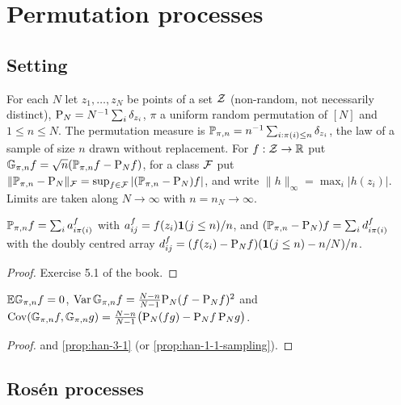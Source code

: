 \chapter{Permutation processes}
\label{chap:permutation-processes}

\section{Setting}

\begin{definition}
  \label{def:population}
  For each $N$ let $z_1,\dots,z_N$ be points of a set $\mathcal{Z}$ (non-random, not necessarily distinct), $\mathrm{P}_N=N^{-1}\sum_i\delta_{z_i}$, $\pi$ a uniform random permutation of $[N]$ and $1\le n\le N$. The permutation measure is $\mathbb{P}_{\pi,n}=n^{-1}\sum_{i:\pi(i)\le n}\delta_{z_i}$, the law of a sample of size $n$ drawn without replacement. For $f:\mathcal{Z}\to\mathbb{R}$ put $\mathbb{G}_{\pi,n} f=\sqrt n(\mathbb{P}_{\pi,n} f-\mathrm{P}_N f)$, for a class $\mathcal{F}$ put $\|\mathbb{P}_{\pi,n}-\mathrm{P}_N\|_{\mathcal{F}}=\sup_{f\in\mathcal{F}}|(\mathbb{P}_{\pi,n}-\mathrm{P}_N)f|$, and write $\|h\|_\infty=\max_i|h(z_i)|$. Limits are taken along $N\to\infty$ with $n=n_N\to\infty$.
\end{definition}

\begin{lemma}
  \label{lem:han-5-2}
  $\mathbb{P}_{\pi,n} f=\sum_ia^f_{i\pi(i)}$ with $a^f_{ij}=f(z_i)\mathbf{1}(j\le n)/n$, and $(\mathbb{P}_{\pi,n}-\mathrm{P}_N)f=\sum_id^f_{i\pi(i)}$ with the doubly centred array $d^f_{ij}=(f(z_i)-\mathrm{P}_N f)(\mathbf{1}(j\le n)-n/N)/n$.
\end{lemma}
\begin{proof}
  Exercise 5.1 of the book.
\end{proof}

\begin{lemma}
  \label{lem:han-5-3}
  $\mathbb{E}\mathbb{G}_{\pi,n} f=0$, $\operatorname{Var}\mathbb{G}_{\pi,n} f=\frac{N-n}{N-1}\mathrm{P}_N(f-\mathrm{P}_N f)^2$ and $\operatorname{Cov}(\mathbb{G}_{\pi,n} f,\mathbb{G}_{\pi,n} g)=\frac{N-n}{N-1}\bigl(\mathrm{P}_N(fg)-\mathrm{P}_N f\,\mathrm{P}_N g\bigr)$.
\end{lemma}
\begin{proof}
   and \cref{prop:han-3-1} (or \cref{prop:han-1-1-sampling}).
\end{proof}

\section{Ros\'en processes}

